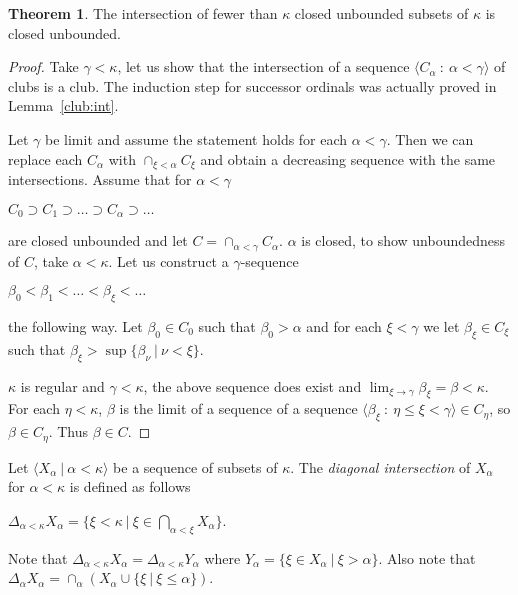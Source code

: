 \documentclass[8pt]{article}
\theoremstyle{definition}
\theoremstyle{definition}
\newtheorem{theorem}{Theorem}[section]
\theoremstyle{definition}
\theoremstyle{definition}
\theoremstyle{definition}
\theoremstyle{definition}
\theoremstyle{definition}
\theoremstyle{definition}
\theoremstyle{definition}
\theoremstyle{definition}
\theoremstyle{definition}
\theoremstyle{definition}
\theoremstyle{definition}
\theoremstyle{definition}
\theoremstyle{question}
\begin{document}
\begin{theorem}
The intersection of fewer than $\kappa$ closed unbounded subsets of $\kappa$ is closed unbounded.
\end{theorem}

\begin{proof}
  Take $\gamma < \kappa$, let us show that the intersection of a sequence 
  $\langle C_{\alpha} \: : \: \alpha < \gamma \rangle$ of clubs is a club.
  The induction step for successor ordinals was actually proved in Lemma~\ref{club:int}.

  Let $\gamma$ be limit and assume the statement holds for each $\alpha < \gamma$.
  Then we can replace each $C_{\alpha}$ with $\cap_{\xi < \alpha} C_{\xi}$ and obtain a decreasing sequence with the same
  intersections. Assume that for $\alpha < \gamma$
  \begin{center}
    $C_0 \supset C_1 \supset \ldots \supset C_{\alpha} \supset \dots $
  \end{center}
  are closed unbounded and let $C = \cap_{\alpha < \gamma} C_{\alpha}$.
  $\alpha$ is closed, to show unboundedness of $C$, take $\alpha < \kappa$. Let us construct a $\gamma$-sequence
  \begin{center}
    $\beta_0 < \beta_1 < \ldots < \beta_{\xi} < \ldots$
  \end{center}
  the following way. Let $\beta_0 \in C_0$ such that $\beta_0 > \alpha$ and for each 
  $\xi < \gamma$ we let $\beta_{\xi} \in C_{\xi}$ such that $\beta_{\xi} > \sup \{ \beta_{\nu} \: | \: \nu < \xi \}$.

  $\kappa$ is regular and $\gamma < \kappa$, the above sequence does exist and 
  $\lim_{\xi \to \gamma} \beta_{\xi} = \beta < \kappa$. For each $\eta < \kappa$, $\beta$ is the limit 
  of a sequence of a sequence $\langle \beta_{\xi} \: : \: \eta \leq \xi < \gamma \rangle \in C_{\eta}$, so $\beta \in C_{\eta}$.
  Thus $\beta \in C$.
\end{proof} 

Let $\langle X_{\alpha} \: | \: \alpha < \kappa \rangle$ be a sequence of subsets of $\kappa$.
The \emph{diagonal intersection} of $X_{\alpha}$ for $\alpha < \kappa$ is defined as follows
\begin{center}
  $\Delta_{\alpha < \kappa} X_{\alpha} = \{ \xi < \kappa \: | \: \xi \in \bigcap \limits_{\alpha < \xi} X_{\alpha} \}$.
\end{center}

Note that $\Delta_{\alpha < \kappa} X_{\alpha} = \Delta_{\alpha < \kappa} Y_{\alpha}$
where $Y_{\alpha} = \{ \xi \in X_{\alpha} \: | \: \xi > \alpha \}$. Also note that
$\Delta_{\alpha} X_{\alpha} = \cap_{\alpha} (X_{\alpha} \cup \{ \xi \: |\: \xi \leq \alpha \})$.
\end{document}
